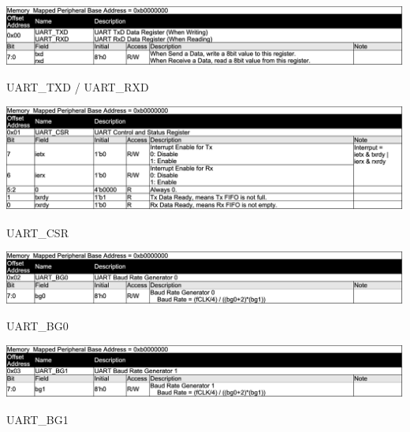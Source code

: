 \begin{table}[H]
    \includegraphics[width=1.0\columnwidth]{./Table/REG_UART_TXDRXD.png}
    \caption{UART\_TXD / UART\_RXD}
    \label{tb:REG_UART_TXDRXD}
\end{table}
\begin{table}[H]
    \includegraphics[width=1.0\columnwidth]{./Table/REG_UART_CSR.png}
    \caption{UART\_CSR}
    \label{tb:REG_UART_CSR}
\end{table}
\begin{table}[H]
    \includegraphics[width=1.0\columnwidth]{./Table/REG_UART_BG0.png}
    \caption{UART\_BG0}
    \label{tb:REG_UART_BG0}
\end{table}
\begin{table}[H]
    \includegraphics[width=1.0\columnwidth]{./Table/REG_UART_BG1.png}
    \caption{UART\_BG1}
    \label{tb:REG_UART_BG1}
\end{table}

